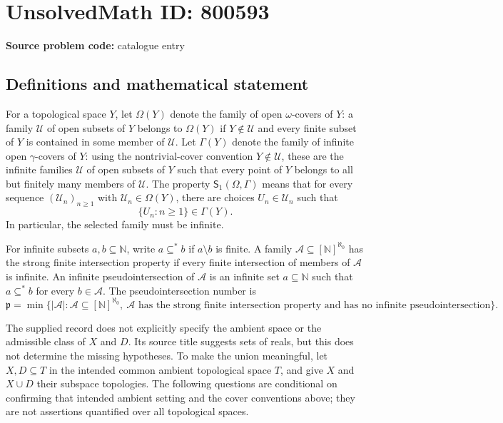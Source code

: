 \documentclass[11pt]{article}
\newcommand{\N}{\mathbb{N}}
\begin{document}
\section*{UnsolvedMath ID: 800593}
\textbf{Source problem code:} catalogue entry
\subsection{Definitions and mathematical statement}
For a topological space \(Y\), let \(\Omega(Y)\) denote the family of open \(\omega\)-covers of \(Y\): a family \(\mathcal U\) of open subsets of \(Y\) belongs to \(\Omega(Y)\) if \(Y\notin\mathcal U\) and every finite subset of \(Y\) is contained in some member of \(\mathcal U\). Let \(\Gamma(Y)\) denote the family of infinite open \(\gamma\)-covers of \(Y\): using the nontrivial-cover convention \(Y\notin\mathcal U\), these are the infinite families \(\mathcal U\) of open subsets of \(Y\) such that every point of \(Y\) belongs to all but finitely many members of \(\mathcal U\). The property \(\mathsf S_1(\Omega,\Gamma)\) means that for every sequence \((\mathcal U_n)_{n\geq 1}\) with \(\mathcal U_n\in\Omega(Y)\), there are choices \(U_n\in\mathcal U_n\) such that
\[
\{U_n:n\geq 1\}\in\Gamma(Y).
\]
In particular, the selected family must be infinite.

For infinite subsets \(a,b\subseteq\N\), write \(a\subseteq^* b\) if \(a\setminus b\) is finite. A family \(\mathcal A\subseteq[\N]^{\aleph_0}\) has the strong finite intersection property if every finite intersection of members of \(\mathcal A\) is infinite. An infinite pseudointersection of \(\mathcal A\) is an infinite set \(a\subseteq\N\) such that \(a\subseteq^* b\) for every \(b\in\mathcal A\). The pseudointersection number is
\[
\mathfrak p=\min\bigl\{|\mathcal A|:\mathcal A\subseteq[\N]^{\aleph_0},\ \mathcal A\text{ has the strong finite intersection property and has no infinite pseudointersection}\bigr\}.
\]

The supplied record does not explicitly specify the ambient space or the admissible class of \(X\) and \(D\). Its source title suggests sets of reals, but this does not determine the missing hypotheses. To make the union meaningful, let \(X,D\subseteq T\) in the intended common ambient topological space \(T\), and give \(X\) and \(X\cup D\) their subspace topologies. The following questions are conditional on confirming that intended ambient setting and the cover conventions above; they are not assertions quantified over all topological spaces.
\end{document}
